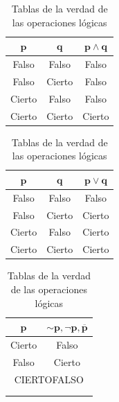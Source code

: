 \documentclass[a4paper]{article}
\begin{document}
\begin{table}[H]
    \centering
    \begin{subfigure}{0.33333\linewidth}
        \centering
        \begin{tabular}{|c|c|c|}
        \hline
        $\mathbf{p}$&$\mathbf{q}$&$\mathbf{p\land q}$\\\hline
        Falso & Falso  & Falso \\\hline
        Falso & Cierto & Falso \\\hline
        Cierto& Falso  & Falso \\\hline
        Cierto& Cierto & Cierto\\\hline
        \end{tabular}
    \end{subfigure}%
    \begin{subfigure}{0.33333\linewidth}
        \centering
        \begin{tabular}{|c|c|c|}
        \hline
        $\mathbf{p}$&$\mathbf{q}$&$\mathbf{p \lor q}$\\\hline
        Falso & Falso  & Falso \\\hline
        Falso & Cierto & Cierto\\\hline
        Cierto& Falso  & Cierto\\\hline
        Cierto& Cierto & Cierto\\\hline
        \end{tabular}
    \end{subfigure}%
    \begin{subfigure}{0.33333\linewidth}
        \centering
        \begin{tabular}{|c|c|}
        \hline
        $\mathbf{p}$&$\mathbf{\sim\!p}, \mathbf{\lnot p}, \mathbf{\overline{p}}$\\\hline
        Cierto & Falso  \\\hline
        Falso & Cierto \\\hline
        \multicolumn{2}{c}{\color{white}CIERTOFALSO\normalcolor}\\\arrayrulecolor{white}\hline
        \multicolumn{2}{c}{\color{white}CIERTOFALSO\normalcolor}\\\arrayrulecolor{white}\hline
        \end{tabular}
    \end{subfigure}
\caption{Tablas de la verdad de las operaciones lógicas}
\label{tab:andTruthTable}
\end{table}
\end{document}
